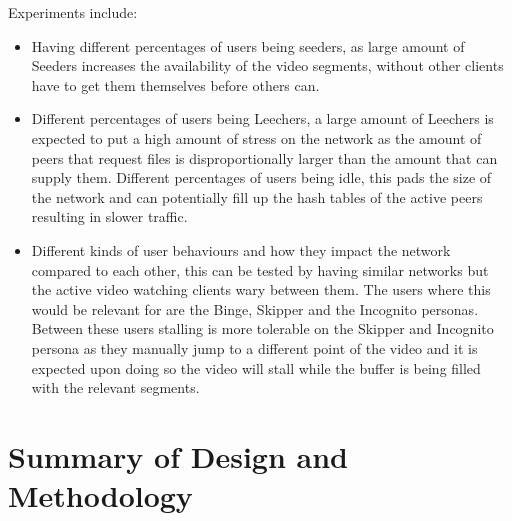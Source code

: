 Experiments include:
\begin{itemize}
\item Having different percentages of users being seeders, as large amount of Seeders increases the availability of the video segments, without other clients have to get them themselves before others can.

\item Different percentages of users being Leechers, a large amount of Leechers is expected to put a high amount of stress on the network as the amount of peers that request files is disproportionally larger than the amount that can supply them.
Different percentages of users being idle, this pads the size of the network and can potentially fill up the hash tables of the active peers resulting in slower traffic.

\item Different kinds of user behaviours and how they impact the network compared to each other, this can be tested by having similar networks but the active video watching clients wary between them. The users where this would be relevant for are the Binge, Skipper and the Incognito personas. Between these users stalling is more tolerable on the Skipper and Incognito persona as they manually jump to a different point of the video and it is expected upon doing so the video will stall while the buffer is being filled with the relevant segments.
\end{itemize}

\section{Summary of Design and Methodology}

